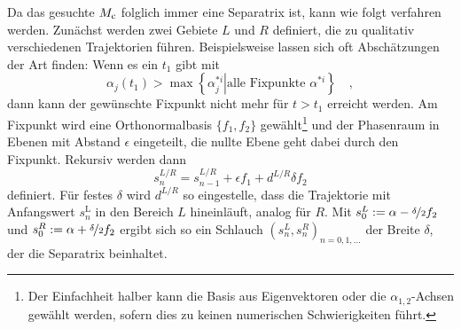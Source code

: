    Da das gesuchte $M_\text{c}$ folglich immer eine Separatrix ist, kann wie folgt 
    verfahren werden. Zunächst werden zwei Gebiete $L$ und $R$ definiert, die 
    zu qualitativ verschiedenen Trajektorien führen. Beispielsweise lassen sich 
    oft Abschätzungen der Art finden: Wenn es 
    ein $t_1$ gibt mit
    \begin{equation}
     \alpha_j(t_1) > \max \left\{ \left. \alpha^{*i}_j \right|\text{alle 
     Fixpunkte } 
     \alpha^{*i}\right\} \quad ,
    \end{equation}
    dann kann der gewünschte Fixpunkt nicht mehr für $t>t_1$ erreicht werden.
    Am Fixpunkt wird eine Orthonormalbasis $\{f_1,f_2\}$ gewählt\footnote{Der 
    Einfachheit halber kann die Basis aus Eigenvektoren oder die 
    $\alpha_{1,2}$-Achsen gewählt werden, sofern dies 
    zu keinen numerischen Schwierigkeiten führt.}
    und der Phasenraum in Ebenen mit Abstand $\epsilon$ 
    eingeteilt, die nullte Ebene geht dabei durch den Fixpunkt. Rekursiv werden 
    dann
    \begin{equation}
     s^{L/R}_n = s^{L/R}_{n-1} + \epsilon f_1 + d^{L/R} \delta f_2 
    \end{equation}
    definiert. Für festes $\delta$ wird $d^{L/R}$ so eingestelle, dass die 
    Trajektorie 
    mit Anfangswert $s^\text{L}_n$ in den Bereich $L$ hineinläuft, analog für 
    $R$. 
    Mit $s^L_0:=\alpha-\nicefrac{\delta}{2}  f_2$ und 
    $s^R_0:=\alpha+\nicefrac{\delta}{2} f_2$ 
    ergibt sich so ein Schlauch $\left(s^{L}_n,s^R_n \right)_{n=0,1,\ldots}$ 
    der Breite 
    $\delta$, der die Separatrix beinhaltet.

    